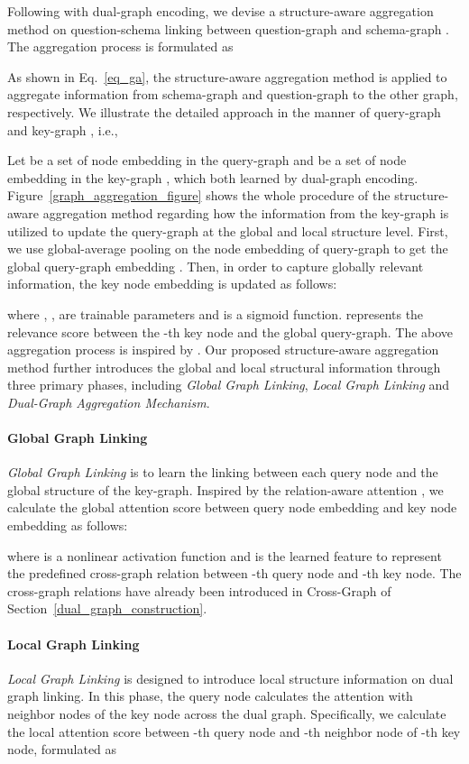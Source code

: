 \documentclass{article}
\begin{document}
Following with dual-graph encoding, we devise a structure-aware aggregation method on question-schema linking between question-graph  and schema-graph . The aggregation process is formulated as


As shown in Eq.~\ref{eq_ga}, the structure-aware aggregation method is applied to aggregate information from schema-graph  and question-graph  to the other graph, respectively. We illustrate the detailed approach in the manner of query-graph  and key-graph , i.e., 


Let  be a set of node embedding in the query-graph  and  be a set of node embedding in the key-graph  , which both learned by dual-graph encoding.
Figure~\ref{graph_aggregation_figure} shows the whole procedure of the structure-aware aggregation method regarding how the information from the key-graph is utilized to update the query-graph at the global and local structure level. First, we use global-average pooling on the node embedding  of query-graph  to get the global query-graph embedding . Then, in order to capture globally relevant information, the key node embedding  is updated as follows:

where , ,  are trainable parameters and  is a sigmoid function.
 represents the relevance score between the -th key node and the global query-graph. The above aggregation process is inspired by \citet{zhang2020comprehensive}. Our proposed structure-aware aggregation method further introduces the global and local structural information through three primary phases, including \emph{Global Graph Linking}, \emph{Local Graph Linking} and \emph{Dual-Graph Aggregation Mechanism}.

\paragraph{Global Graph Linking}
\emph{Global Graph Linking} is to learn the linking between each query node and the global structure of the key-graph. Inspired by the relation-aware attention \citep{wang2020rat}, we calculate the global attention score  between query node embedding  and key node embedding  as follows:

where  is a nonlinear activation function and  is the learned feature to represent the predefined cross-graph relation between -th query node and -th key node. 
The cross-graph relations have already been introduced in Cross-Graph of Section~\ref{dual_graph_construction}.

\paragraph{Local Graph Linking}
\emph{Local Graph Linking} is designed to introduce local structure information on dual graph linking. In this phase, the query node calculates the attention with neighbor nodes of the key node across the dual graph. Specifically, we calculate the local attention score  between -th query node and -th neighbor node of -th key node, formulated as
\end{document}
